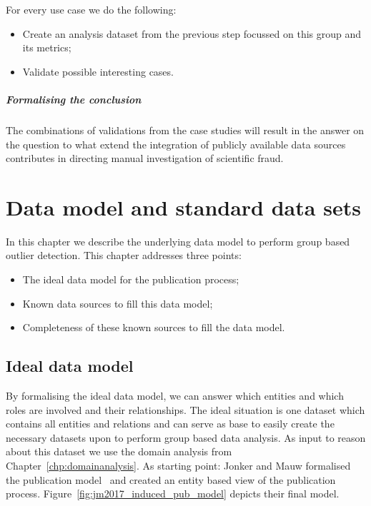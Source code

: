 \documentclass{ou-report}
\begin{document}
For every use case we do the following:
\begin{itemize}
    \item Create an analysis dataset from the previous step focussed on this
    group and its metrics;
    \item Validate possible interesting cases.
\end{itemize}

\paragraph{Formalising the conclusion}
The combinations of validations from the case studies will result in the
answer on the question to what extend the integration of publicly available data 
sources contributes in directing manual investigation of scientific fraud.

\chapter{Data model and standard data sets}
\label{chp:data}
In this chapter we describe the underlying data model to perform group based 
outlier detection. This chapter addresses three points:
\begin{itemize}
    \item The ideal data model for the publication process;
    \item Known data sources to fill this data model;
    \item Completeness of these known sources to fill the data model.
\end{itemize}


\section{Ideal data model}
By formalising the ideal data model, we can answer which entities and which 
roles are involved and their relationships.
The ideal situation is one dataset which contains all entities and relations 
and can serve as base to easily create the necessary datasets upon to perform 
group based data analysis. As 
input to reason about this dataset we use the domain analysis from 
Chapter~\ref{chp:domainanalysis}.
As starting point: Jonker and Mauw formalised the publication
model~\cite{JM2017} 
and created an entity based view of the publication process. 
Figure~\ref{fig:jm2017_induced_pub_model} depicts their final model.
\end{document}
